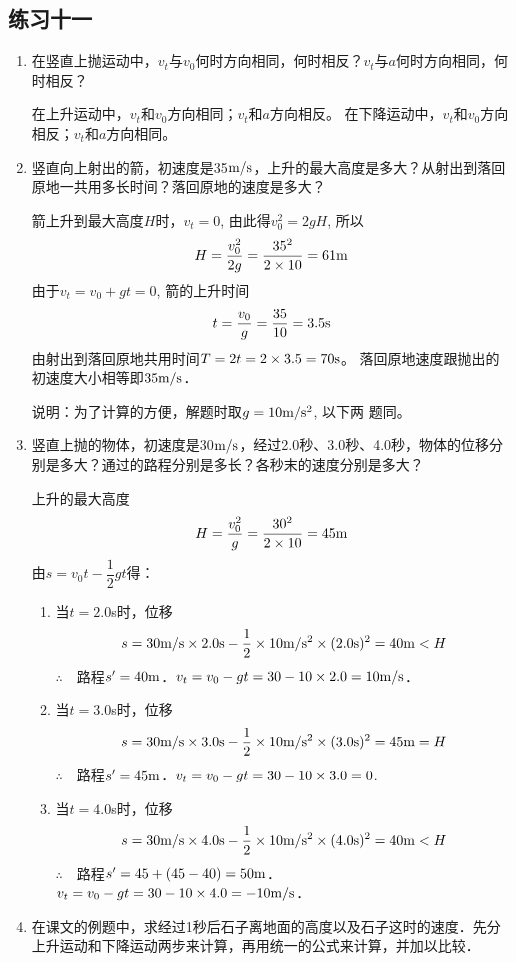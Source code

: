 \subsection{练习十一}

\begin{enumerate}
	\item 在竖直上抛运动中，$v_t$与$v_0$何时方向相同，何时相反？$v_t$与$a$何时方向相同，何时相反？

    \begin{solution}
        在上升运动中，$v_t$和$v_0$方向相同；$v_t$和$a$方向相反。
        在下降运动中，$v_t$和$v_0$方向相反；$v_t$和$a$方向相同。 
    \end{solution}
\item 竖直向上射出的箭，初速度是35$\text{m}/\text{s}$，上升的最大高度是多大？从射出到落回原地一共用多长时间？落回原地的速度是多大？

\begin{solution}
箭上升到最大高度$H$时，$v_t=0$, 由此得$v^2_0=2gH$,
所以
\[H=\frac{v^2_0}{2g}=\frac{35^2}{2\times 10}=61{\rm m}\]
由于$v_t=v_0+gt=0$, 箭的上升时间
\[t=\frac{v_0}{g}=\frac{35}{10}=3.5{\rm s}\]
由射出到落回原地共用时间$T=2t=2\times3.5=70{\rm s}$。
落回原地速度跟抛出的初速度大小相等即$35\text{m}/\text{s}$．

说明：为了计算的方便，解题时取$g=10\text{m}/\text{s}^2$, 以下两
题同。
\end{solution}
\item 竖直上抛的物体，初速度是30$\text{m}/\text{s}$，经过2.0秒、3.0秒、4.0秒，物体的位移分别是多大？通过的路程分别是多长？各秒末的速度分别是多大？

\begin{solution}
上升的最大高度
\[H=\frac{v^2_0}{g}=\frac{30^2}{2\times 10}=45{\rm m}\]
由$s=v_0t-\dfrac{1}{2}gt$得：
\begin{enumerate}
    \item 当$t=2.0$s时，位移
    \[s=30\text{m}/\text{s} \times2.0{\rm s}-\frac{1}{2}\times 10\text{m}/\text{s}^2\times(2.0{\rm s})^2=40{\rm m}<H\]
    $\therefore\quad $路程$s'=40{\rm m}$．$v_t=v_0-gt=30-10\times2.0=10\text{m}/\text{s}$．
\item 当$t=3.0$s时，位移$$s=30\text{m}/\text{s}\times3.0{\rm s}-\frac{1}{2}
\times10\text{m}/\text{s}^2\times(3.0{\rm s})^2=45{\rm m}=H$$
$\therefore\quad $路程$s'=45{\rm m}$．$v_t=v_0-gt=30-10\times3.0=0$.
\item 当$t=4.0$s时，位移$$s=30\text{m}/\text{s}\times4.0{\rm s}-\frac{1}{2}
\times10\text{m}/\text{s}^2\times(4.0{\rm s})^2=40{\rm m}<H$$
$\therefore\quad $路程$s'=45+(45-40)=50{\rm m}$．
$v_t=v_0-gt=30-10\times4.0=-10\text{m}/\text{s}$．
\end{enumerate}

\end{solution}
\item 在课文的例题中，求经过1秒后石子离地面的高度以及石子这时的速度．先分上升运动和下降运动两步来计算，再用统一的公式来计算，并加以比较．


\end{enumerate}
